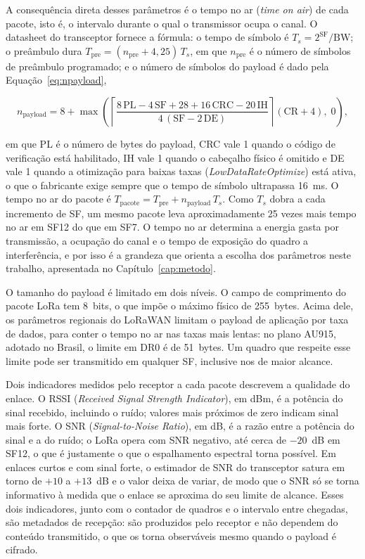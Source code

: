 A consequência direta desses parâmetros é o tempo no ar (\textit{time on air}) de cada pacote, isto é, o intervalo durante o qual o transmissor ocupa o canal. O datasheet do transceptor \cite{semtech2015sx1276} fornece a fórmula: o tempo de símbolo é $T_s = 2^{\mathrm{SF}}/\mathrm{BW}$; o preâmbulo dura $T_{\mathrm{pre}} = (n_{\mathrm{pre}} + 4{,}25)\,T_s$, em que $n_{\mathrm{pre}}$ é o número de símbolos de preâmbulo programado; e o número de símbolos do payload é dado pela Equação~\ref{eq:npayload},

\begin{equation}
\label{eq:npayload}
n_{\mathrm{payload}} = 8 + \max\!\left( \left\lceil \frac{8\,\mathrm{PL} - 4\,\mathrm{SF} + 28 + 16\,\mathrm{CRC} - 20\,\mathrm{IH}}{4\,(\mathrm{SF} - 2\,\mathrm{DE})} \right\rceil (\mathrm{CR} + 4),\; 0 \right),
\end{equation}

\noindent em que PL é o número de bytes do payload, CRC vale 1 quando o código de verificação está habilitado, IH vale 1 quando o cabeçalho físico é omitido e DE vale 1 quando a otimização para baixas taxas (\textit{LowDataRateOptimize}) está ativa, o que o fabricante exige sempre que o tempo de símbolo ultrapassa 16~ms. O tempo no ar do pacote é $T_{\mathrm{pacote}} = T_{\mathrm{pre}} + n_{\mathrm{payload}}\,T_s$. Como $T_s$ dobra a cada incremento de SF, um mesmo pacote leva aproximadamente 25 vezes mais tempo no ar em SF12 do que em SF7. O tempo no ar determina a energia gasta por transmissão, a ocupação do canal e o tempo de exposição do quadro a interferência, e por isso é a grandeza que orienta a escolha dos parâmetros neste trabalho, apresentada no Capítulo~\ref{cap:metodo}.

O tamanho do payload é limitado em dois níveis. O campo de comprimento do pacote LoRa tem 8~bits, o que impõe o máximo físico de 255~bytes. Acima dele, os parâmetros regionais do LoRaWAN \cite{lorawan_rp002} limitam o payload de aplicação por taxa de dados, para conter o tempo no ar nas taxas mais lentas: no plano AU915, adotado no Brasil, o limite em DR0 é de 51~bytes. Um quadro que respeite esse limite pode ser transmitido em qualquer SF, inclusive nos de maior alcance.

Dois indicadores medidos pelo receptor a cada pacote descrevem a qualidade do enlace. O RSSI (\textit{Received Signal Strength Indicator}), em dBm, é a potência do sinal recebido, incluindo o ruído; valores mais próximos de zero indicam sinal mais forte. O SNR (\textit{Signal-to-Noise Ratio}), em dB, é a razão entre a potência do sinal e a do ruído; o LoRa opera com SNR negativo, até cerca de $-20$~dB em SF12, o que é justamente o que o espalhamento espectral torna possível. Em enlaces curtos e com sinal forte, o estimador de SNR do transceptor satura em torno de $+10$ a $+13$~dB e o valor deixa de variar, de modo que o SNR só se torna informativo à medida que o enlace se aproxima do seu limite de alcance. Esses dois indicadores, junto com o contador de quadros e o intervalo entre chegadas, são metadados de recepção: são produzidos pelo receptor e não dependem do conteúdo transmitido, o que os torna observáveis mesmo quando o payload é cifrado.

